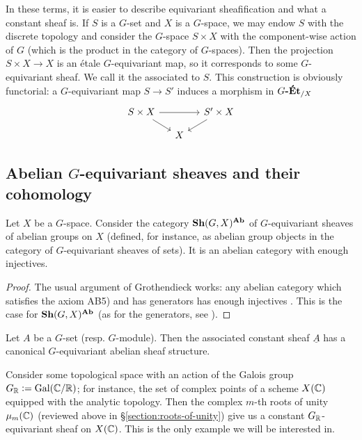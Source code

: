 \begin{example}
  \label{example:constant-G-equivariant-sheaf-as-esace-etale}
  In these terms, it is easier to describe equivariant sheafification and what a
  constant sheaf is. If $S$ is a $G$-set and $X$ is a $G$-space, we may endow
  $S$ with the discrete topology and consider the $G$-space $S\times X$ with the
  component-wise action of $G$ (which is the product in the category of
  $G$-spaces). Then the projection $S\times X\to X$ is an étale $G$-equivariant
  map, so it corresponds to some $G$-equivariant sheaf. We call it the
   associated to $S$. This construction is
  obviously functorial: a $G$-equivariant map $S \to S'$ induces a morphism in
  $G\text{\bf -Ét}_{/X}$
  \[ \begin{tikzcd}[row sep=small, column sep=small]
      S\times X\ar{rr}\ar{dr} & & S'\times X\ar{dl} \\
      & X
  \end{tikzcd} \]
\end{example}

\subsection*{Abelian $G$-equivariant sheaves and their cohomology}

\begin{proposition}
  Let $X$ be a $G$-space. Consider the category $\text{\bf Sh} (G,X)^{\text{\bf Ab}}$ of
  $G$-equivariant sheaves of abelian groups on $X$ (defined, for instance, as
  abelian group objects in the category of $G$-equivariant sheaves of sets).
  It is an abelian category with enough injectives.

  \begin{proof}
    The usual argument of Grothendieck works: any abelian category which
    satisfies the axiom AB5) and has generators has enough injectives
    \cite[Ch.~I, 1.10]{Tohoku-paper}. This is the case for
    $\text{\bf Sh} (G,X)^{\text{\bf Ab}}$ (as for the generators, see
    \cite[Appendix]{MacLane-Moerdijk-94}).
  \end{proof}
\end{proposition}

\begin{example}
  Let $A$ be a $G$-set (resp. $G$-module). Then the associated constant sheaf
  $\underline{A}$ has a canonical $G$-equivariant abelian sheaf structure.
\end{example}

\begin{example}
  Consider some topological space with an action of the Galois group
  $G_{\mathbb{R}} \mathrel{\mathop:}= \operatorname{Gal} (\mathbb{C}/\mathbb{R})$; for instance, the set of complex points of
  a scheme $X (\mathbb{C})$ equipped with the analytic topology. Then the complex
  $m$-th roots of unity $\mu_m (\mathbb{C})$ (reviewed above in
  \S\ref{section:roots-of-unity}) give us a constant $G_{\mathbb{R}}$-equivariant sheaf
  on $X (\mathbb{C})$. This is the only example we will be interested in.
\end{example}

